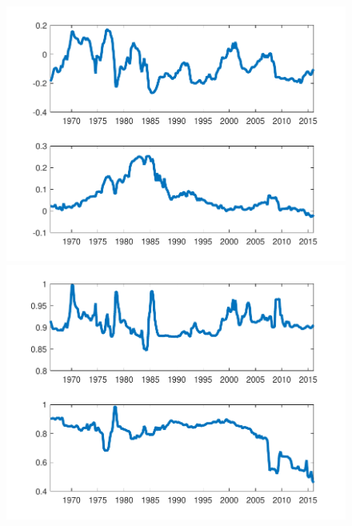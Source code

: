 \documentclass[12pt,reqno]{article}
\numberwithin{equation}{section}
\begin{document}
\begin{figure}[H]
\includegraphics[scale=0.6]{NKPC_filter_init_AR1_alphas.pdf}
\includegraphics[scale=0.6]{NKPC_filter_init_AR1_betas.pdf}


\end{figure}

\newpage
\end{document}
